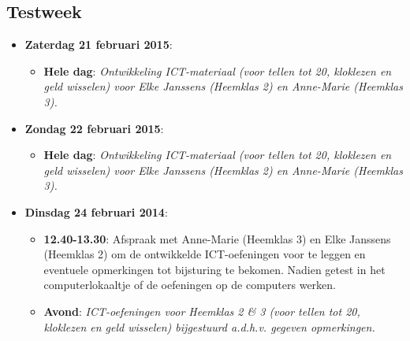 \documentclass[a4paper,11pt]{article}
\theoremstyle{definition}
\begin{document}
\begin{itemize}
\begin{itemize}
\end{itemize}
\subsection{Testweek}
\begin{itemize}
  \item \textbf{Zaterdag 21 februari 2015}:
  \begin{itemize}
    \item \textbf{Hele dag}: \emph{ Ontwikkeling ICT-materiaal (voor tellen tot 20, kloklezen en geld wisselen)
  voor Elke Janssens (Heemklas 2) en Anne-Marie (Heemklas 3).}
  \end{itemize}

  

   \item \textbf{Zondag 22 februari 2015}:  \begin{itemize}
    \item \textbf{Hele dag}: \emph{ Ontwikkeling ICT-materiaal (voor tellen tot 20, kloklezen en geld wisselen)
  voor Elke Janssens (Heemklas 2) en Anne-Marie (Heemklas 3).}
  \end{itemize}

  \item  \textbf{Dinsdag 24 februari 2014}:     
  \begin{itemize}
    \item \textbf{12.40-13.30}:   Afspraak met Anne-Marie (Heemklas 3) en Elke Janssens (Heemklas 2) om de ontwikkelde ICT-oefeningen voor te leggen
    en eventuele opmerkingen tot bijsturing te bekomen. Nadien getest in het computerlokaaltje of de oefeningen op de computers werken.
    \item \textbf{Avond}: \emph{ICT-oefeningen voor Heemklas 2 \& 3 (voor tellen tot 20, kloklezen en geld wisselen) bijgestuurd a.d.h.v. gegeven opmerkingen.}
  \end{itemize}
  

\end{itemize}
\end{itemize}
\end{document}
